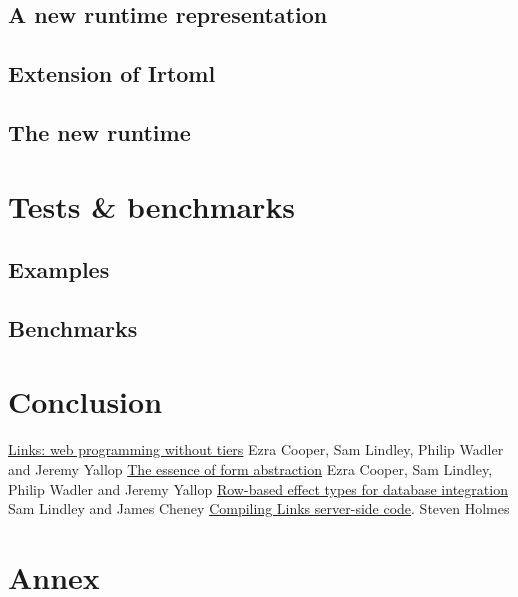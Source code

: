 \documentclass[11pt]{article}
\newcommand\module[1]{{\bf #1}}
\begin{document}
\subsection{A new runtime representation}



\subsection{Extension of \module{Irtoml}}


\subsection{The new runtime}



\section{Tests \& benchmarks}

\subsection{Examples}

\subsection{Benchmarks}

\section{Conclusion}

\begin{thebibliography}{99}
 \href{http://groups.inf.ed.ac.uk/links/papers/links-fmco06.pdf}{Links: web programming without tiers} Ezra Cooper, Sam Lindley, Philip Wadler and Jeremy Yallop
 \href{http://groups.inf.ed.ac.uk/links/papers/formlets-essence.pdf}{The essence of form abstraction} Ezra Cooper, Sam Lindley, Philip Wadler and Jeremy Yallop
 \href{http://homepages.inf.ed.ac.uk/slindley/papers/corelinks.pdf}{Row-based effect types for database integration} Sam Lindley and James Cheney
 \href{http://groups.inf.ed.ac.uk/links/papers/undergrads/steven.pdf}{Compiling Links server-side code}. Steven Holmes
\end{thebibliography}

\section*{Annex}
\end{document}
